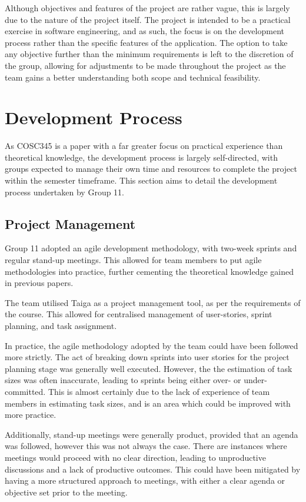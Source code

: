 \documentclass[conference]{IEEEtran}
\begin{document}
Although objectives and features of the project are rather vague, this is largely due to the nature of the project itself. The project is intended to be a practical exercise in software engineering, and as such, the focus is on the development process rather than the specific features of the application. The option to take any objective further than the minimum requirements is left to the discretion of the group, allowing for adjustments to be made throughout the project as the team gains a better understanding both scope and technical feasibility.

\section{Development Process}
As COSC345 is a paper with a far greater focus on practical experience than theoretical knowledge, the development process is largely self-directed, with groups expected to manage their own time and resources to complete the project within the semester timeframe. This section aims to detail the development process undertaken by Group 11.

\subsection{Project Management}
Group 11 adopted an agile development methodology, with two-week sprints and regular stand-up meetings. This allowed for team members to put agile methodologies into practice, further cementing the theoretical knowledge gained in previous papers.

The team utilised Taiga as a project management tool, as per the requirements of the course. This allowed for centralised management of user-stories, sprint planning, and task assignment.

In practice, the agile methodology adopted by the team could have been followed more strictly. The act of breaking down sprints into user stories for the project planning stage was generally well executed. However, the the estimation of task sizes was often inaccurate, leading to sprints being either over- or under-committed. This is almost certainly due to the lack of experience of team members in estimating task sizes, and is an area which could be improved with more practice.

Additionally, stand-up meetings were generally product, provided that an agenda was followed, however this was not always the case. There are instances where meetings would proceed with no clear direction, leading to unproductive discussions and a lack of productive outcomes. This could have been mitigated by having a more structured approach to meetings, with either a clear agenda or objective set prior to the meeting.
\end{document}
